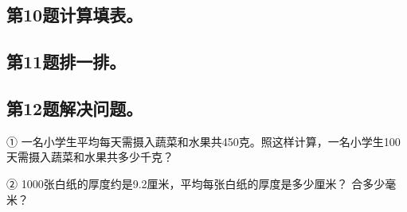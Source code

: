 \subsection*{第10题\quad 计算填表。}
\subsection*{第11题\quad 排一排。}
\subsection*{第12题\quad 解决问题。}
\noindent ① 一名小学生平均每天需摄入蔬菜和水果共450克。照这样计算，一名小学生100天需摄入蔬菜和水果共多少千克？\par
{}
\noindent ② 1000张白纸的厚度约是9.2厘米，平均每张白纸的厚度是多少厘米？ 合多少毫米？\par
{}
